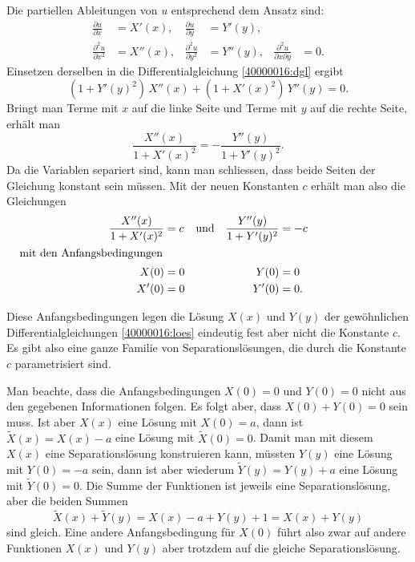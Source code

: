 \begin{loesung}
\begin{teilaufgaben}
\item
Die partiellen Ableitungen von $u$ entsprechend dem Ansatz sind:
\begin{equation*}
\begin{aligned}
\frac{\partial u}{\partial x}
&=
X'(x),
&
\frac{\partial u}{\partial y}
&=
Y'(y),
\\
\frac{\partial^2 u}{\partial x^2}
&=
X''(x),
&
\frac{\partial^2 u}{\partial y^2}
&=
Y''(y),
&
\frac{\partial^2 u}{\partial x\partial y}
&=
0.
\end{aligned}
\end{equation*}
Einsetzen derselben in die Differentialgleichung \eqref{40000016:dgl} 
ergibt
\begin{equation}
(1+Y'(y)^2)\, X''(x) + (1+X'(x)^2)\, Y''(y) = 0.
\label{40000016:dgl2}
\end{equation}
Bringt man Terme mit $x$ auf die linke Seite und Terme mit $y$ auf die
rechte Seite, erhält man
\begin{equation}
\frac{X''(x)}{1+X'(x)^2}
=
-\frac{Y''(y)}{1+Y'(y)^2}.
\label{40000016:sep}
\end{equation}
Da die Variablen separiert sind, kann man schliessen, dass beide Seiten
der Gleichung konstant sein müssen.
Mit der neuen Konstanten $c$ erhält man also die Gleichungen
\begin{align}
\qquad\qquad\qquad\qquad
\frac{X''(x)}{1+X'(x)^2} &= c
&
&\text{und}&
\frac{Y''(y)}{1+Y'(y)^2} &= -c
\qquad\qquad\qquad\qquad
\label{40000016:loes}
\\
\intertext{mit den Anfangsbedingungen}
X(0) &= 0
&&&
Y(0) &= 0
\notag
\\
X'(0) &= 0
&&&
Y'(0) &= 0.
\notag
\end{align}
\item
Diese Anfangsbedingungen legen die Lösung $X(x)$ und $Y(y)$
der gewöhnlichen Differentialgleichungen
\eqref{40000016:loes}
eindeutig
fest aber nicht die Konstante $c$.
Es gibt also eine ganze Familie von Separationslösungen, die durch
die Konstante $c$ parametrisiert sind.
\end{teilaufgaben}

Man beachte, dass die Anfangsbedingungen $X(0)=0$ und $Y(0)=0$ nicht aus
den gegebenen Informationen folgen.
Es folgt aber, dass $X(0) + Y(0) = 0$ sein muss.
Ist aber $X(x)$ eine Lösung mit $X(0)=a$, dann ist $\tilde X(x) = X(x)-a$
eine Lösung mit $\tilde X(0)=0$.
Damit man mit diesem $X(x)$ eine Separationslösung konstruieren kann,
müssten $Y(y)$ eine Lösung mit $Y(0)=-a$ sein, dann ist aber
wiederum $\tilde Y(y) = Y(y)+a$ eine Lösung mit $\tilde Y(0)=0$.
Die Summe der Funktionen ist jeweils eine Separationslösung, aber die
beiden Summen
\[
\tilde X(x)+\tilde Y(y)
=
X(x)-a + Y(y)+1
=
X(x)+Y(y)
\]
sind gleich.
Eine andere Anfangsbedingung für $X(0)$ führt also zwar auf
andere Funktionen $X(x)$ und $Y(y)$ aber trotzdem auf die gleiche
Separationslösung.
\qedhere
\end{loesung}

